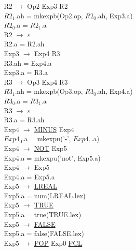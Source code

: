 \documentclass[\main/MemoriaPL.tex]{subfiles}
\begin{document}
    R2 $\rightarrow$ Op2 Exp3 R2\\
    \hspace{5mm}$R2_1$.ah = mkexpb(Op2.op, $R2_0$.ah, Exp3.a)\\
    \hspace{5mm}$R2_0$.a = $R2_1$.a\\
    R2 $\rightarrow$ $\varepsilon$\\
    \hspace{5mm}R2.a = R2.ah\\
    Exp3 $\rightarrow$ Exp4 R3\\
    \hspace{5mm}R3.ah = Exp4.a\\
    \hspace{5mm}Exp3.a = R3.a\\
    R3 $\rightarrow$ Op3 Exp4 R3\\
    \hspace{5mm}$R3_1$.ah = mkexpb(Op3.op, $R3_0$.ah, Exp4.a)\\
    \hspace{5mm}$R3_0$.a = $R3_1$.a\\
    R3 $\rightarrow$ $\varepsilon$\\
    \hspace{5mm}R3.a = R3.ah\\
    Exp4 $\rightarrow$ \underline{MINUS} Exp4\\
    \hspace{5mm}$Exp4_0$.a = mkexpu('-', $Exp4_1$.a)\\
    Exp4 $\rightarrow$ \underline{NOT} Exp5\\
    \hspace{5mm}Exp4.a = mkexpu('not', Exp5.a)\\
    Exp4 $\rightarrow$ Exp5\\
    \hspace{5mm}Exp4.a = Exp5.a\\
    Exp5 $\rightarrow$ \underline{LREAL}\\
    \hspace*{5mm}Exp5.a = num(LREAL.lex)\\
    Exp5 $\rightarrow$ \underline{TRUE}\\
    \hspace*{5mm}Exp5.a = true(TRUE.lex)\\
    Exp5 $\rightarrow$ \underline{FALSE}\\
    \hspace*{5mm}Exp5.a = false(FALSE.lex)\\
    Exp5 $\rightarrow$ \underline{POP} Exp0 \underline{PCL}\\
\end{document}
